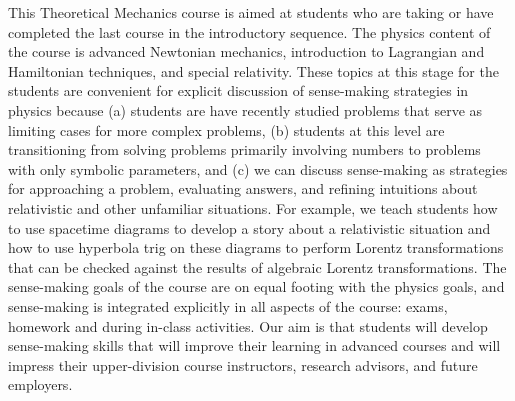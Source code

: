 \documentclass[english,aps,pra,reprint,noshowpacs,superscriptaddress]{revtex4-1}
\begin{document}
This Theoretical Mechanics course is aimed at students who are taking
or have completed the last course in the introductory sequence. The
physics content of the course is advanced Newtonian mechanics,
introduction to Lagrangian and Hamiltonian techniques, and special
relativity. These topics at this stage for the students are convenient
for explicit discussion of sense-making strategies in physics because
(a) students are have recently studied problems that serve as limiting
cases for more complex problems, (b) students at this level are
transitioning from solving problems primarily involving numbers to
problems with only symbolic parameters, and (c) we can discuss
sense-making as strategies for approaching a problem, evaluating
answers, and refining intuitions about relativistic and other
unfamiliar situations. For example, we teach students how to use
spacetime diagrams to develop a story about a relativistic situation
and how to use hyperbola trig on these diagrams to perform Lorentz
transformations that can be checked against the results of algebraic
Lorentz transformations.  The sense-making goals of the course are on
equal footing with the physics goals, and sense-making is integrated
explicitly in all aspects of the course: exams, homework and during
in-class activities. Our aim is that students will develop
sense-making skills that will improve their learning in advanced
courses and will impress their upper-division course instructors,
research advisors, and future employers.

\end{document}
